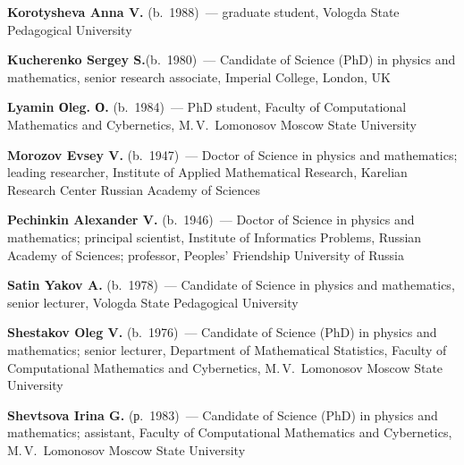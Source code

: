 \begin{multicols}{2}
{}


\vspace*{6pt}

\noindent
\textbf{Korotysheva Anna V.} (b.\ 1988)~--- graduate student, Vologda State
Pedagogical University

\vspace*{6pt}

\noindent
\textbf{Kucherenko Sergey S.}(b.\ 1980)~---  Candidate of Science (PhD) in 
physics and mathematics, senior research associate, Imperial College, London, UK

\vspace*{6pt}

\noindent
\textbf{Lyamin Оleg. О.} (b.\ 1984)~--- PhD student, Faculty of Computational 
Mathematics and Cybernetics, M.\,V.~Lomonosov Moscow State University

\columnbreak


\noindent
\textbf{Morozov Evsey V.}  (b.\ 1947)~---  Doctor of Science in physics and mathematics;
leading researcher, Institute of Applied Mathematical Research, Karelian
Research Center Russian Academy of Sciences


\vspace*{6pt}

\noindent
\textbf{Pechinkin Alexander V.} (b.\ 1946)~--- Doctor of Science in physics and mathematics;
principal scientist, Institute of Informatics Problems, Russian Academy of
Sciences; professor, Peoples' Friendship University of Russia


\vspace*{6pt}

\noindent
\textbf{Satin Yakov A.} (b.\ 1978)~--- %
Candidate of Science in physics and
mathematics, senior lecturer, Vologda State Pedagogical University

\vspace*{6pt}

\noindent
\textbf{Shestakov Oleg V.} (b.\ 1976)~--- Candidate of Science (PhD) in 
physics and mathematics; senior lecturer, Department of Mathematical Statistics, Faculty of 
Computational Mathematics and Cybernetics, M.\,V.~Lomonosov Moscow State University

\vspace*{6pt}

\noindent
\textbf{Shevtsova Irina G.} (р.\ 1983)~--- Candidate of Science (PhD) in 
physics and mathematics; assistant, Faculty of 
Computational Mathematics and Cybernetics, M.\,V.~Lomonosov Moscow State University



\end{multicols}
